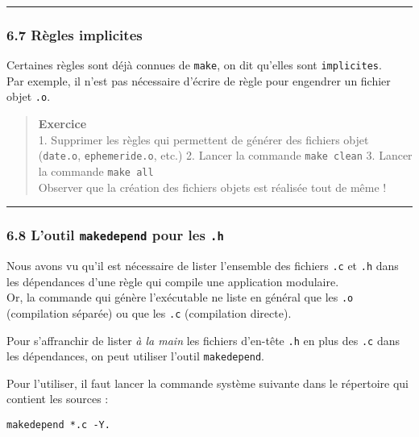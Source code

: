 \documentclass[11pt]{article}
\begin{document}
    \begin{center}\rule{0.5\linewidth}{\linethickness}\end{center}

    \subsubsection{6.7 Règles implicites}\label{ruxe8gles-implicites}

Certaines règles sont déjà connues de \texttt{make}, on dit qu'elles
sont \texttt{implicites}.\\
Par exemple, il n'est pas nécessaire d'écrire de règle pour engendrer un
fichier objet \texttt{.o}.

\begin{quote}
\textbf{Exercice}\\
1. Supprimer les règles qui permettent de générer des fichiers objet
(\texttt{date.o}, \texttt{ephemeride.o}, etc.) 2. Lancer la commande
\texttt{make\ clean} 3. Lancer la commande \texttt{make\ all}\\
Observer que la création des fichiers objets est réalisée tout de même !
\end{quote}

    \begin{center}\rule{0.5\linewidth}{\linethickness}\end{center}

    \subsubsection{\texorpdfstring{6.8 L'outil \texttt{makedepend} pour les
\texttt{.h}}{6.8 L'outil makedepend pour les .h}}\label{loutil-makedepend-pour-les-.h}

Nous avons vu qu'il est nécessaire de lister l'ensemble des fichiers
\texttt{.c} et \texttt{.h} dans les dépendances d'une règle qui compile
une application modulaire.\\
Or, la commande qui génère l'exécutable ne liste en général que les
\texttt{.o} (compilation séparée) ou que les \texttt{.c} (compilation
directe).

Pour s'affranchir de lister \emph{à la main} les fichiers d'en-tête
\texttt{.h} en plus des \texttt{.c} dans les dépendances, on peut
utiliser l'outil \texttt{makedepend}.

Pour l'utiliser, il faut lancer la commande système suivante dans le
répertoire qui contient les sources :

\begin{verbatim}
makedepend *.c -Y.
\end{verbatim}
\end{document}
